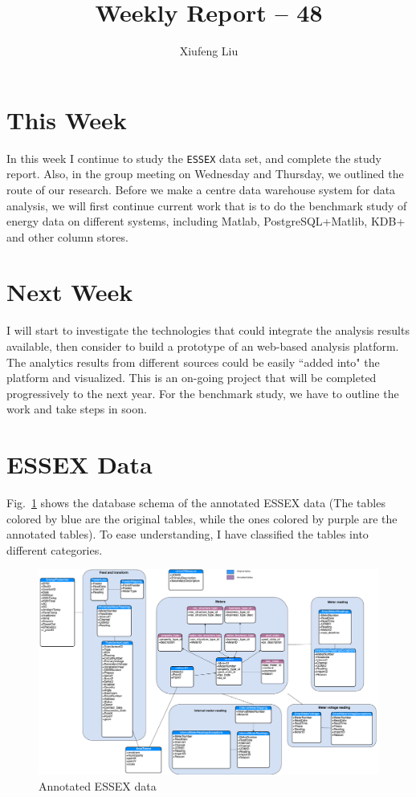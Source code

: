 \documentclass[a4paper,12pt]{llncs}
\begin{document}
\title{Weekly Report -- 48}
\author{Xiufeng Liu}
\maketitle


\section{This Week}
In this week I continue to study the \texttt{ESSEX} data set, and complete the study report. Also, in the group meeting on Wednesday and Thursday, we outlined the route of our research. Before we make a centre data warehouse system for data analysis, we will first continue current work that is to do the benchmark study of energy data on different systems, including Matlab, PostgreSQL+Matlib,  KDB+ and other column stores. 

\section{Next Week}
I will start to investigate the technologies that could integrate the analysis results available, then consider to build a prototype of an web-based analysis platform.  The analytics results from different sources could be easily ``added into" the platform and visualized. This is an on-going project that will be completed progressively to the next year. For the benchmark study, we have to outline the work and take steps in soon.



\section{ESSEX Data}
Fig.~\ref{fig:essex_annotated} shows the database schema of the annotated ESSEX data (The tables colored by blue are the original tables, while the ones colored by purple are the annotated tables). To ease understanding, I have classified the tables into different categories.
\begin{figure}[htp]
\centering
\includegraphics[width=1.1\textwidth]{images/essex_annotated}
\caption{Annotated ESSEX data}
\label{fig:essex_annotated}
\end{figure}
\end{document}
